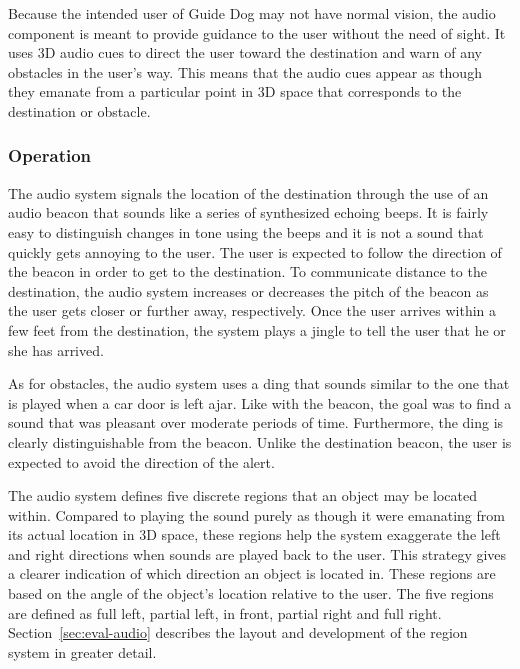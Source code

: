 Because the intended user of Guide Dog may not have normal vision, the audio 
component is meant to provide guidance to the user without the need of sight. It
uses 3D audio cues to direct the user toward the destination and warn of any 
obstacles in the user's way. This means that the audio cues appear as though
they emanate from a particular point in 3D space that corresponds to the
destination or obstacle.

\subsubsection{Operation}
\label{sec:technical-audio-op}

The audio system signals the location of the destination through the use of an
audio beacon that sounds like a series of synthesized echoing beeps. It is
fairly easy to distinguish changes in tone using the beeps and it is not a sound
that quickly gets annoying to the user. The user is expected to follow the
direction of the beacon in order to get to the destination. To communicate
distance to the destination, the audio system increases or decreases the pitch
of the beacon as the user gets closer or further away, respectively. Once the
user arrives within a few feet from the destination, the system plays a jingle
to tell the user that he or she has arrived. 

As for obstacles, the audio system uses a ding that sounds similar to the one
that is played when a car door is left ajar. Like with the beacon, the goal was
to find a sound that was pleasant over moderate periods of time.  Furthermore,
the ding is clearly distinguishable from the beacon. Unlike the destination
beacon, the user is expected to avoid the direction of the alert.

The audio system defines five discrete regions that an object may be located
within. Compared to playing the sound purely as though it were emanating from
its actual location in 3D space, these regions help the system exaggerate the
left and right directions when sounds are played back to the user.  This
strategy gives a clearer indication of which direction an object is located in.
These regions are based on the angle of the object's location relative to the
user. The five regions are defined as full left, partial left, in front, partial
right and full right. Section~\ref{sec:eval-audio} describes the layout and
development of the region system in greater detail.

